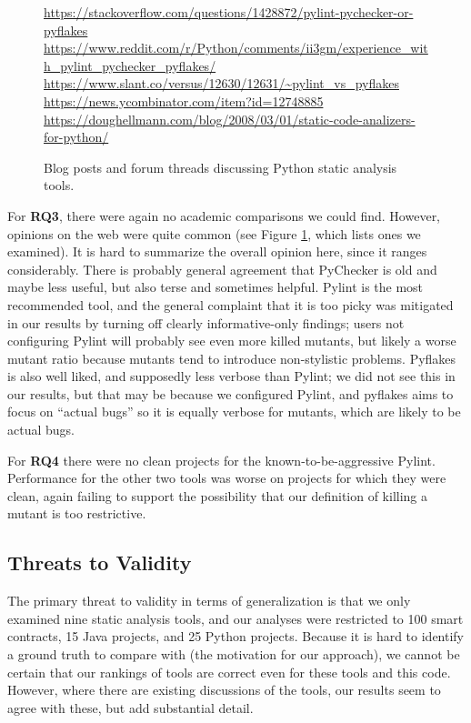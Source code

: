 \begin{figure}
  {\scriptsize
    \raggedright
  \url{https://stackoverflow.com/questions/1428872/pylint-pychecker-or-pyflakes}\\
  \url{https://www.reddit.com/r/Python/comments/ii3gm/experience_with_pylint_pychecker_pyflakes/}\\
  \url{https://www.slant.co/versus/12630/12631/~pylint_vs_pyflakes}\\
  \url{https://news.ycombinator.com/item?id=12748885}\\
  \url{https://doughellmann.com/blog/2008/03/01/static-code-analizers-for-python/}\\
  }
\caption{Blog posts and forum threads discussing Python static analysis tools.}
\label{fig:blogpython}
\end{figure}

For {\bf RQ3}, there were again no academic comparisons we could find.  However, opinions on the web were quite common (see Figure \ref{fig:blogpython}, which lists ones we examined).  It is hard to summarize the overall opinion here, since it ranges considerably.  There is probably general agreement that PyChecker is old and maybe less useful, but also terse and sometimes helpful.  Pylint is the most recommended tool, and the general complaint that it is too picky was mitigated in our results by turning off clearly informative-only findings; users not configuring Pylint will probably see even more killed mutants, but likely a worse mutant ratio because mutants tend to introduce non-stylistic problems.  Pyflakes is also well liked, and supposedly less verbose than Pylint; we did not see this in our results, but that may be because we configured Pylint, and pyflakes aims to focus on ``actual bugs'' so it is equally verbose for mutants, which are likely to be actual bugs.

For {\bf RQ4} there were no clean projects for the known-to-be-aggressive Pylint.  Performance for the other two tools was worse on projects for which they were clean, again failing to support the possibility that our definition of killing a mutant is too restrictive.

\subsection{Threats to Validity}

The primary threat to validity in terms of generalization is that we only examined nine static analysis tools, and our analyses were restricted to 100 smart contracts, 15 Java projects, and 25 Python projects.   Because it is hard to identify a ground truth to compare with (the motivation for our approach), we cannot be certain that our rankings of tools are correct even for these tools and this code.  However, where there are existing discussions of the tools, our results seem to agree with these, but add substantial detail.


